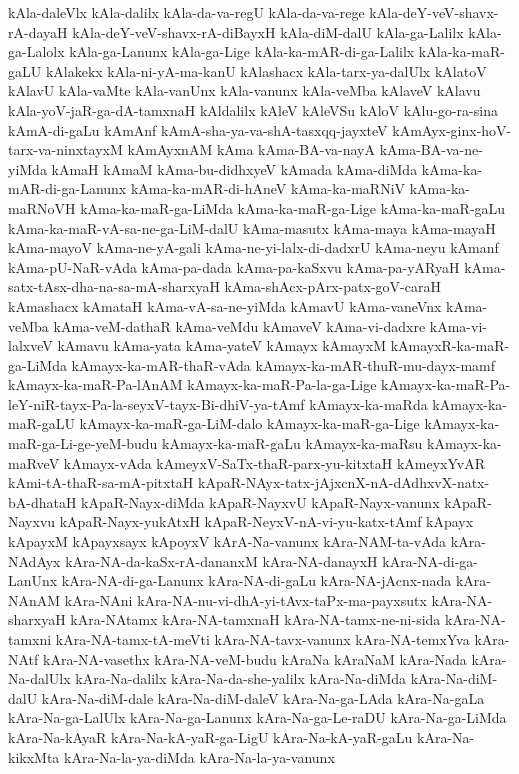 {kAla-daleVlx
kAla-dalilx
kAla-da-va-regU
kAla-da-va-rege
kAla-deY-veV-shavx-rA-dayaH
kAla-deY-veV-shavx-rA-diBayxH
kAla-diM-dalU
kAla-ga-Lalilx
kAla-ga-Lalolx
kAla-ga-Lanunx
kAla-ga-Lige
kAla-ka-mAR-di-ga-Lalilx
kAla-ka-maR-gaLU
kAlakekx
kAla-ni-yA-ma-kanU
kAlashacx
kAla-tarx-ya-dalUlx
kAlatoV
kAlavU
kAla-vaMte
kAla-vanUnx
kAla-vanunx
kAla-veMba
kAlaveV
kAlavu
kAla-yoV-jaR-ga-dA-tamxnaH
kAldalilx
kAleV
kAleVSu
kAloV
kAlu-go-ra-sina
kAmA-di-gaLu
kAmAnf
kAmA-sha-ya-va-shA-tasxqq-jayxteV
kAmAyx-ginx-hoV-tarx-va-ninxtayxM
kAmAyxnAM
kAma
kAma-BA-va-nayA
kAma-BA-va-ne-yiMda
kAmaH
kAmaM
kAma-bu-didhxyeV
kAmada
kAma-diMda
kAma-ka-mAR-di-ga-Lanunx
kAma-ka-mAR-di-hAneV
kAma-ka-maRNiV
kAma-ka-maRNoVH
kAma-ka-maR-ga-LiMda
kAma-ka-maR-ga-Lige
kAma-ka-maR-gaLu
kAma-ka-maR-vA-sa-ne-ga-LiM-dalU
kAma-masutx
kAma-maya
kAma-mayaH
kAma-mayoV
kAma-ne-yA-gali
kAma-ne-yi-lalx-di-dadxrU
kAma-neyu
kAmanf
kAma-pU-NaR-vAda
kAma-pa-dada
kAma-pa-kaSxvu
kAma-pa-yARyaH
kAma-satx-tAsx-dha-na-sa-mA-sharxyaH
kAma-shAcx-pArx-patx-goV-caraH
kAmashacx
kAmataH
kAma-vA-sa-ne-yiMda
kAmavU
kAma-vaneVnx
kAma-veMba
kAma-veM-dathaR
kAma-veMdu
kAmaveV
kAma-vi-dadxre
kAma-vi-lalxveV
kAmavu
kAma-yata
kAma-yateV
kAmayx
kAmayxM
kAmayxR-ka-maR-ga-LiMda
kAmayx-ka-mAR-thaR-vAda
kAmayx-ka-mAR-thuR-mu-dayx-mamf
kAmayx-ka-maR-Pa-lAnAM
kAmayx-ka-maR-Pa-la-ga-Lige
kAmayx-ka-maR-Pa-leY-niR-tayx-Pa-la-seyxV-tayx-Bi-dhiV-ya-tAmf
kAmayx-ka-maRda
kAmayx-ka-maR-gaLU
kAmayx-ka-maR-ga-LiM-dalo
kAmayx-ka-maR-ga-Lige
kAmayx-ka-maR-ga-Li-ge-yeM-budu
kAmayx-ka-maR-gaLu
kAmayx-ka-maRsu
kAmayx-ka-maRveV
kAmayx-vAda
kAmeyxV-SaTx-thaR-parx-yu-kitxtaH
kAmeyxYvAR
kAmi-tA-thaR-sa-mA-pitxtaH
kApaR-NAyx-tatx-jAjxcnX-nA-dAdhxvX-natx-bA-dhataH
kApaR-Nayx-diMda
kApaR-NayxvU
kApaR-Nayx-vanunx
kApaR-Nayxvu
kApaR-Nayx-yukAtxH
kApaR-NeyxV-nA-vi-yu-katx-tAmf
kApayx
kApayxM
kApayxsayx
kApoyxV
kArA-Na-vanunx
kAra-NAM-ta-vAda
kAra-NAdAyx
kAra-NA-da-kaSx-rA-dananxM
kAra-NA-danayxH
kAra-NA-di-ga-LanUnx
kAra-NA-di-ga-Lanunx
kAra-NA-di-gaLu
kAra-NA-jAcnx-nada
kAra-NAnAM
kAra-NAni
kAra-NA-nu-vi-dhA-yi-tAvx-taPx-ma-payxsutx
kAra-NA-sharxyaH
kAra-NAtamx
kAra-NA-tamxnaH
kAra-NA-tamx-ne-ni-sida
kAra-NA-tamxni
kAra-NA-tamx-tA-meVti
kAra-NA-tavx-vanunx
kAra-NA-temxYva
kAra-NAtf
kAra-NA-vasethx
kAra-NA-veM-budu
kAraNa
kAraNaM
kAra-Nada
kAra-Na-dalUlx
kAra-Na-dalilx
kAra-Na-da-she-yalilx
kAra-Na-diMda
kAra-Na-diM-dalU
kAra-Na-diM-dale
kAra-Na-diM-daleV
kAra-Na-ga-LAda
kAra-Na-gaLa
kAra-Na-ga-LalUlx
kAra-Na-ga-Lanunx
kAra-Na-ga-Le-raDU
kAra-Na-ga-LiMda
kAra-Na-kAyaR
kAra-Na-kA-yaR-ga-LigU
kAra-Na-kA-yaR-gaLu
kAra-Na-kikxMta
kAra-Na-la-ya-diMda
kAra-Na-la-ya-vanunx
}

